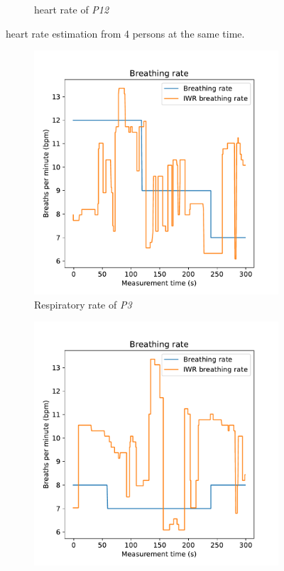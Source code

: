 \begin{figure}[t]
\begin{subfigure}{.45\textwidth}
  \caption{heart rate of \emph{P12}}
  \label{fig:romy4_heart}
\end{subfigure}
\caption{heart rate estimation from 4 persons at the same time.}
\label{fig:4pers_heart_meas}
\end{figure}

\begin{figure}[t]
\centering
\begin{subfigure}{.45\textwidth}
  \centering
  \includegraphics[width=\linewidth]{figures/validation/roy4_breath.pdf}  
  \caption{Respiratory rate of \emph{P3}}
  \label{fig:roy4_breath}
\end{subfigure}
\begin{subfigure}{.45\textwidth}
  \centering
  \includegraphics[width=\linewidth]{figures/validation/nick4_breath.pdf}  

\end{subfigure}
\end{figure}

